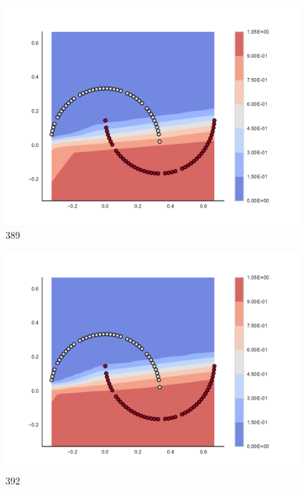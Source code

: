 \begin{subfigure}[b]{0.09\textwidth}
    \includegraphics[clip, trim=2.35cm 1.75cm 4.5cm 0cm,width=\textwidth]{img/convergence/389.pdf}
    \caption{389}
    \label{fig:convergence_389}
\end{subfigure}
%
\begin{subfigure}[b]{0.09\textwidth}
    \includegraphics[clip, trim=2.35cm 1.75cm 4.5cm 0cm,width=\textwidth]{img/convergence/392.pdf}
    \caption{392}
    \label{fig:convergence_392}
\end{subfigure}
%
